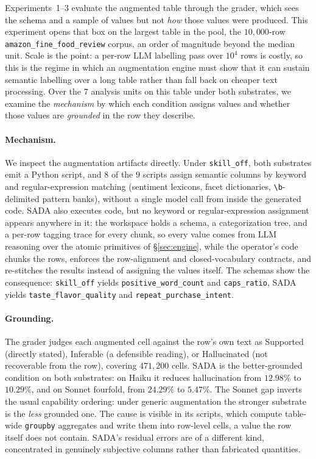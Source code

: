 Experiments~1--3 evaluate the augmented table through the grader, which sees the schema and a sample of values but not \emph{how} those values were produced. This experiment opens that box on the largest table in the pool, the $10{,}000$-row \texttt{amazon\_fine\_food\_review} corpus, an order of magnitude beyond the median unit. Scale is the point: a per-row LLM labelling pass over $10^4$ rows is costly, so this is the regime in which an augmentation engine must show that it can sustain semantic labelling over a long table rather than fall back on cheaper text processing. Over the $7$ analysis units on this table under both substrates, we examine the \emph{mechanism} by which each condition assigns values and whether those values are \emph{grounded} in the row they describe.

\paragraph{Mechanism.} We inspect the augmentation artifacts directly. Under \texttt{skill\_off}, both substrates emit a Python script, and $8$ of the $9$ scripts assign semantic columns by keyword and regular-expression matching (sentiment lexicons, facet dictionaries, \verb|\b|-delimited pattern banks), without a single model call from inside the generated code. SADA also executes code, but no keyword or regular-expression assignment appears anywhere in it: the workspace holds a schema, a categorization tree, and a per-row tagging trace for every chunk, so every value comes from LLM reasoning over the atomic primitives of \S\ref{sec:engine}, while the operator's code chunks the rows, enforces the row-alignment and closed-vocabulary contracts, and re-stitches the results instead of assigning the values itself. The schemas show the consequence: \texttt{skill\_off} yields \texttt{positive\_\allowbreak word\_\allowbreak count} and \texttt{caps\_\allowbreak ratio}, SADA yields \texttt{taste\_\allowbreak flavor\_\allowbreak quality} and \texttt{repeat\_\allowbreak purchase\_\allowbreak intent}.
\paragraph{Grounding.} The grader judges each augmented cell against the row's own text as \textsf{Supported} (directly stated), \textsf{Inferable} (a defensible reading), or \textsf{Hallucinated} (not recoverable from the row), covering $471{,}200$ cells. SADA is the better-grounded condition on both substrates: on Haiku it reduces hallucination from $12.98\%$ to $10.29\%$, and on Sonnet fourfold, from $24.29\%$ to $5.47\%$. The Sonnet gap inverts the usual capability ordering: under generic augmentation the stronger substrate is the \emph{less} grounded one. The cause is visible in its scripts, which compute table-wide \texttt{groupby} aggregates and write them into row-level cells, a value the row itself does not contain. SADA's residual errors are of a different kind, concentrated in genuinely subjective columns rather than fabricated quantities.

